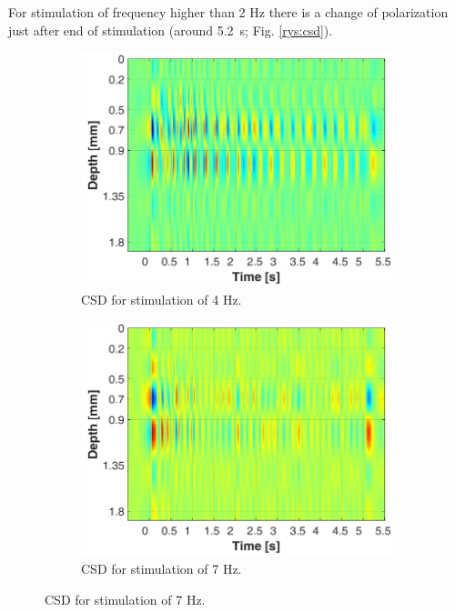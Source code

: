 \documentclass{pracalicmgr}
\begin{document}
For stimulation of frequency higher than 2 Hz there is a change of polarization just after end of stimulation (around 5.2~s; Fig. \ref{rys:csd}). 

	\begin{figure}[H]	
	\begin{subfigure}{.5\textwidth}
		\centering
		\includegraphics[width=1.\linewidth]{csd_4Hz_5s.png}
		\caption{CSD for stimulation of 4 Hz.}
		\label{rys:csd_4Hz}
	\end{subfigure}
	\begin{subfigure}{.5\textwidth}
		\centering
		\includegraphics[width=1.\linewidth]{csd_7Hz_5s.png}
		\caption{CSD for stimulation of 7 Hz.}
		\label{rys:csd_7Hz}
	\end{subfigure}
	

\end{figure}
\end{document}

